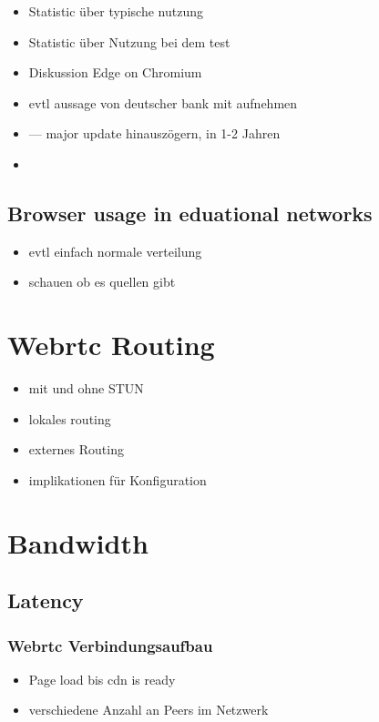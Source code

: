 \begin{itemize}
	\item Statistic über typische nutzung
	\item Statistic über Nutzung bei dem test
	\item Diskussion Edge on Chromium
	\item evtl aussage von deutscher bank mit aufnehmen
	\item  --- major update hinauszögern, in 1-2 Jahren
	\item 
\end{itemize}


\subsection{Browser usage in eduational networks}
\begin{itemize}
	\item evtl einfach normale verteilung
	\item schauen ob es quellen gibt
\end{itemize}
\section{Webrtc Routing}
\begin{itemize}
	\item mit und ohne STUN
	\item lokales routing
	\item externes Routing
	\item implikationen für Konfiguration
\end{itemize}
\section{Bandwidth}



\subsection{Latency}

\subsubsection{Webrtc Verbindungsaufbau}

\begin{itemize}
	\item Page load bis cdn is ready
	\item verschiedene Anzahl an Peers im Netzwerk 
\end{itemize}

